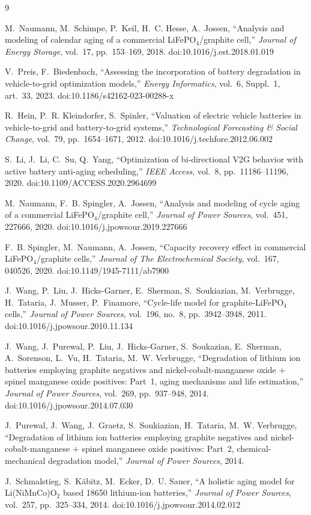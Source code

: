 \documentclass[11pt,a4paper]{article}
\begin{document}
\begin{thebibliography}{9}

M.~Naumann, M.~Schimpe, P.~Keil, H.~C. Hesse, A.~Jossen,
``Analysis and modeling of calendar aging of a commercial
LiFePO$_4$/graphite cell,''
\emph{Journal of Energy Storage}, vol.~17, pp.~153--169, 2018.
doi:10.1016/j.est.2018.01.019

V.~Preis, F.~Biedenbach,
``Assessing the incorporation of battery degradation in
vehicle-to-grid optimization models,''
\emph{Energy Informatics}, vol.~6, Suppl.~1, art.~33, 2023.
doi:10.1186/s42162-023-00288-x

R.~Hein, P.~R. Kleindorfer, S.~Spinler,
``Valuation of electric vehicle batteries in vehicle-to-grid and
battery-to-grid systems,''
\emph{Technological Forecasting \& Social Change}, vol.~79,
pp.~1654--1671, 2012. doi:10.1016/j.techfore.2012.06.002

S.~Li, J.~Li, C.~Su, Q.~Yang,
``Optimization of bi-directional V2G behavior with active battery
anti-aging scheduling,''
\emph{IEEE Access}, vol.~8, pp.~11186--11196, 2020.
doi:10.1109/ACCESS.2020.2964699

M.~Naumann, F.~B. Spingler, A.~Jossen,
``Analysis and modeling of cycle aging of a commercial
LiFePO$_4$/graphite cell,''
\emph{Journal of Power Sources}, vol.~451, 227666, 2020.
doi:10.1016/j.jpowsour.2019.227666

F.~B. Spingler, M.~Naumann, A.~Jossen,
``Capacity recovery effect in commercial LiFePO$_4$/graphite cells,''
\emph{Journal of The Electrochemical Society}, vol.~167, 040526, 2020.
doi:10.1149/1945-7111/ab7900

J.~Wang, P.~Liu, J.~Hicks-Garner, E.~Sherman, S.~Soukiazian,
M.~Verbrugge, H.~Tataria, J.~Musser, P.~Finamore,
``Cycle-life model for graphite-LiFePO$_4$ cells,''
\emph{Journal of Power Sources}, vol.~196, no.~8, pp.~3942--3948, 2011.
doi:10.1016/j.jpowsour.2010.11.134

J.~Wang, J.~Purewal, P.~Liu, J.~Hicks-Garner, S.~Soukazian, E.~Sherman,
A.~Sorenson, L.~Vu, H.~Tataria, M.~W. Verbrugge,
``Degradation of lithium ion batteries employing graphite negatives and
nickel-cobalt-manganese oxide $+$ spinel manganese oxide positives:
Part~1, aging mechanisms and life estimation,''
\emph{Journal of Power Sources}, vol.~269, pp.~937--948, 2014.
doi:10.1016/j.jpowsour.2014.07.030

J.~Purewal, J.~Wang, J.~Graetz, S.~Soukiazian, H.~Tataria,
M.~W. Verbrugge,
``Degradation of lithium ion batteries employing graphite negatives and
nickel-cobalt-manganese $+$ spinel manganese oxide positives:
Part~2, chemical-mechanical degradation model,''
\emph{Journal of Power Sources}, 2014.

J.~Schmalstieg, S.~K\"abitz, M.~Ecker, D.~U. Sauer,
``A holistic aging model for Li(NiMnCo)O$_2$ based 18650 lithium-ion
batteries,''
\emph{Journal of Power Sources}, vol.~257, pp.~325--334, 2014.
doi:10.1016/j.jpowsour.2014.02.012

\end{thebibliography}
\end{document}
